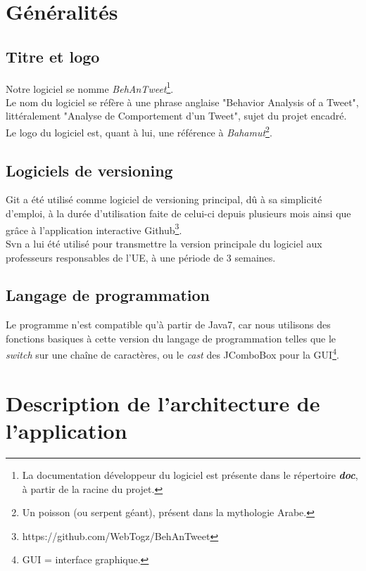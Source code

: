 \documentclass[pdftex,12pt,a4paper]{report}
\begin{document}
\begin{spacing}{1.2}
\section{Généralités}

\subsection{Titre et logo}

Notre logiciel se nomme \textit{BehAnTweet}\footnote{La documentation développeur du logiciel est présente dans le répertoire \textit{\textbf{doc}}, à partir de la racine du projet.}.\\
Le nom du logiciel se réfère à une phrase anglaise "Behavior Analysis of a Tweet", littéralement "Analyse de Comportement d'un Tweet", sujet du projet encadré.\\
Le logo du logiciel est, quant à lui, une référence à \textit{Bahamut}\footnote{Un poisson (ou serpent géant), présent dans la mythologie Arabe.}.

\subsection{Logiciels de versioning}

Git a été utilisé comme logiciel de versioning principal, dû à sa simplicité d'emploi, à la durée d'utilisation faite de celui-ci depuis plusieurs mois ainsi que grâce à l'application interactive Github\footnote{https://github.com/WebTogz/BehAnTweet}.\\
Svn a lui été utilisé pour transmettre la version principale du logiciel aux professeurs responsables de l'UE, à une période de 3 semaines.

\subsection{Langage de programmation}

Le programme n'est compatible qu'à partir de Java7, car nous utilisons des fonctions basiques à cette version du langage de programmation telles que le \textit{switch} sur une chaîne de caractères, ou le \textit{cast} des JComboBox pour la GUI\footnote{GUI = interface graphique.}.

\section{Description de l'architecture de l'application}


\end{spacing}
\end{document}

